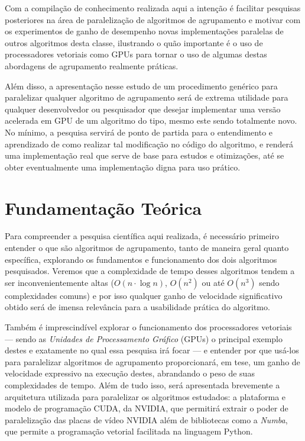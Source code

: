 \documentclass[12pt,
openright, 
oneside, %
a4paper,    %
brazil]{facom-ufu-abntex2}
\def\qntAlgrtm{dois}
\begin{document}
Com a compilação de conhecimento realizada aqui a intenção é facilitar pesquisas posteriores na área de paralelização de algoritmos de agrupamento e motivar com os experimentos de ganho de desempenho novas implementações paralelas de outros algoritmos desta classe, ilustrando o quão importante é o uso de processadores vetoriais como GPUs para tornar o uso de algumas destas abordagens de agrupamento realmente práticas.

Além disso, a apresentação nesse estudo de um procedimento genérico para paralelizar qualquer algoritmo de agrupamento será de extrema utilidade para qualquer desenvolvedor ou pesquisador que desejar implementar uma versão acelerada em GPU de um algoritmo do tipo, mesmo este sendo totalmente novo. No mínimo, a pesquisa servirá de ponto de partida para o entendimento e aprendizado de como realizar tal modificação no código do algoritmo, e renderá uma implementação real que serve de base para estudos e otimizações, até se obter eventualmente uma implementação digna para uso prático.





\chapter{Fundamentação Teórica}

Para compreender a pesquisa científica aqui realizada, é necessário primeiro entender o que são algoritmos de agrupamento, tanto de maneira geral quanto específica, explorando os fundamentos e funcionamento dos \qntAlgrtm{} algoritmos pesquisados. Veremos que a complexidade de tempo desses algoritmos tendem a ser inconvenientemente altas ($O(n\cdot\log{n})$, $O(n^2)$ ou até $O(n^3)$ sendo complexidades comuns) e por isso qualquer ganho de velocidade significativo obtido será de imensa relevância para a usabilidade prática do algoritmo.

Também é imprescindível explorar o funcionamento dos processadores vetoriais --- sendo as \textit{Unidades de Processamento Gráfico} (GPUs) o principal exemplo destes e exatamente no qual essa pesquisa irá focar --- e entender por que usá-los para paralelizar algoritmos de agrupamento proporcionará, em tese, um ganho de velocidade expressivo na execução destes, abrandando o peso de suas complexidades de tempo. Além de tudo isso, será apresentada brevemente a arquitetura utilizada para paralelizar os algoritmos estudados: a plataforma e modelo de programação CUDA, da NVIDIA, que permitirá extrair o poder de paralelização das placas de vídeo NVIDIA além de bibliotecas como a \textit{Numba}, que permite a programação vetorial facilitada na linguagem Python.
\end{document}
